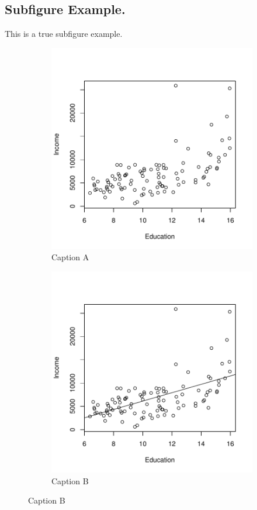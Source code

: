 \subsection{Subfigure Example.}
This is a true subfigure example.
\begin{figure}[h]
    \begin{subfigure}{.55\textwidth}
      \centering
      \includegraphics[width=.8\linewidth]{chap_2_figures/example_1}
      \caption{Caption A}
      \label{fig:third_fig_1}
    \end{subfigure}
    \begin{subfigure}{.55\textwidth}
      \centering
      \includegraphics[width=.8\linewidth]{chap_2_figures/example_2}
      \caption{Caption B}
      \label{fig:third_fig_2}
    \end{subfigure}
\end{figure}
